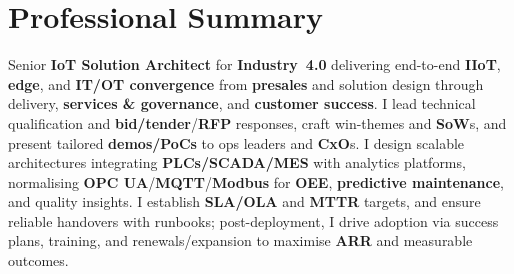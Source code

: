 \documentclass[11pt,a4paper,sans]{moderncv} %
\newcommand{\kw}[1]{\textbf{#1}}
\begin{document}
\makecvtitle
\vspace*{-1.5\baselineskip} %

\section{Professional Summary}
\begin{justify}
Senior \kw{IoT Solution Architect} for \kw{Industry~4.0} delivering end-to-end \kw{IIoT}, \kw{edge}, and \kw{IT/OT convergence} from \kw{presales} and solution design through delivery, \kw{services \& governance}, and \kw{customer success}. I lead technical qualification and \kw{bid/tender}/\kw{RFP} responses, craft win-themes and \kw{SoW}s, and present tailored \kw{demos/PoCs} to ops leaders and \kw{CxO}s. I design scalable architectures integrating \kw{PLCs/SCADA/MES} with analytics platforms, normalising \kw{OPC UA}/\kw{MQTT}/\kw{Modbus} for \kw{OEE}, \kw{predictive maintenance}, and quality insights. I establish \kw{SLA/OLA} and \kw{MTTR} targets, and ensure reliable handovers with runbooks; post-deployment, I drive adoption via success plans, training, and renewals/expansion to maximise \kw{ARR} and measurable outcomes.
\end{justify}


\end{document}
